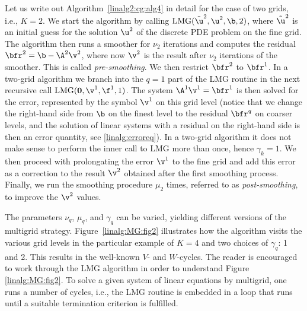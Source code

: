
Let us write out Algorithm~\ref{linalg2:cg:alg4}
in detail for the case of two grids, i.e.,
$K=2$.
We start the algorithm by calling $\mbox{LMG}(\tilde\u^2,\u^2,\b,2)$,
where $\tilde\u^2$ is an initial guess for the solution $\u^2$ of the
discrete PDE problem on
the fine grid.
The algorithm then runs a smoother for $\nu_2$ iterations and
computes the residual $\bfr^2=\b -\A^2\v^2$, where now $\v^2$ is
the result after $\nu_2$ iterations of the smoother.
This is called \emph{pre-smoothing}.
We then restrict $\bfr^2$ to $\bfr^{1}$.
In a two-grid algorithm we branch into the $q=1$ part of the LMG
routine in the next recursive call $\mbox{LMG}(\mathbf{0},\v^{1},\f^{1},1)$.
The system $\A^{1}\v^{1}=\bfr^{1}$ is then solved for the error,
represented by the symbol $\v^{1}$ on this grid level (notice that
we change the
right-hand side from $\b$ on the finest level to the residual $\bfr^q$
on coarser levels, and the solution of linear systems with a residual
on the right-hand side is then an error quantity, see
\eqref{linalg:erroreq}).
In a two-grid algorithm it does not make sense to perform the inner
call to LMG more than once, hence $\gamma_k=1$.
We then proceed with prolongating the error $\v^{1}$ to the fine grid
and add this error as a correction to the result $\v^2$ obtained after the
first smoothing process. Finally, we run the smoothing procedure
$\mu_2$ times, referred to as \emph{post-smoothing}, to improve the $\v^2$
values.

The parameters $\nu_q$, $\mu_q$, and $\gamma_q$ can be varied, yielding
different versions of the multigrid strategy.
Figure~\ref{linalg:MG:fig2} illustrates how the algorithm visits the
various grid levels in the particular example of $K=4$ and two
choices of $\gamma_q$: 1 and 2. This results in the well-known
$V$- and $W$-cycles. The reader is encouraged to work through
the LMG algorithm in order to understand Figure \ref{linalg:MG:fig2}.
To solve a given system of linear equations by multigrid, one runs
a number of cycles, i.e., the LMG routine is embedded in a loop that runs
until a suitable termination criterion is fulfilled.

